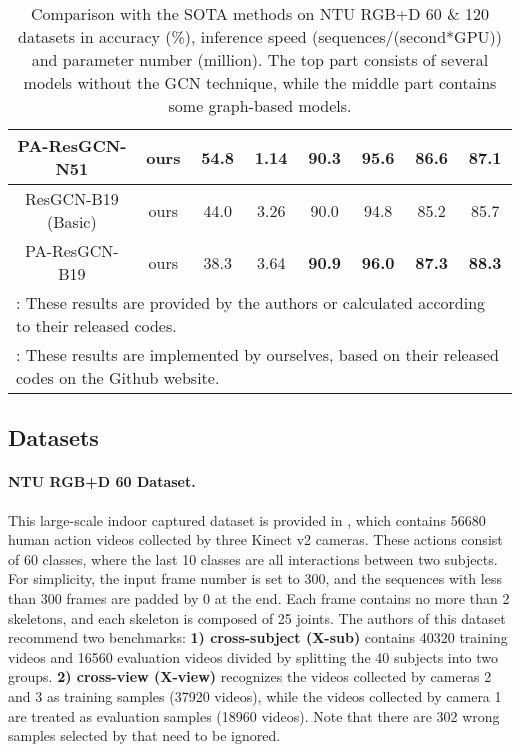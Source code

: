 \documentclass[sigconf]{acmart}
\begin{document}
\begin{table*}
\begin{center}
\begin{tabular}{cc|cc|cc|cc}
  PA-ResGCN-N51 & ours & 54.8 & 1.14 & 90.3 & 95.6 & 86.6 & 87.1 \\
  \hline
  ResGCN-B19 (Basic) & ours & 44.0 & 3.26 & 90.0 & 94.8 & 85.2 & 85.7 \\
  PA-ResGCN-B19 & ours & 38.3 & 3.64 & {\bf 90.9} & {\bf 96.0} & {\bf 87.3} & {\bf 88.3} \\
  \hline
  \multicolumn{8}{l}{: These results are provided by the authors or calculated according to their released codes.}\\
  \multicolumn{8}{l}{: These results are implemented by ourselves, based on their released codes on the Github website.}\\
  \end{tabular}
  \end{center}
  \caption{Comparison with the SOTA methods on NTU RGB+D 60 \& 120 datasets in accuracy (\%), inference speed (sequences/(second*GPU)) and parameter number (million). The top part consists of several models without the GCN technique, while the middle part contains some graph-based models.}\label{tab:ntu}
  \vspace{-0.6cm}
\end{table*}

\subsection{Datasets}
\label{ssec:datasets}

\paragraph{NTU RGB+D 60 Dataset.} This large-scale indoor captured dataset is provided in \cite{shahroudy2016ntu}, which contains 56680 human action videos collected by three Kinect v2 cameras. These actions consist of 60 classes, where the last 10 classes are all interactions between two subjects. For simplicity, the input frame number is set to 300, and the sequences with less than 300 frames are padded by 0 at the end. Each frame contains no more than 2 skeletons, and each skeleton is composed of 25 joints. The authors of this dataset recommend two benchmarks: {\bf 1) cross-subject (X-sub)} contains 40320 training videos and 16560 evaluation videos divided by splitting the 40 subjects into two groups. {\bf 2) cross-view (X-view)} recognizes the videos collected by cameras 2 and 3 as training samples (37920 videos), while the videos collected by camera 1 are treated as evaluation samples (18960 videos). Note that there are 302 wrong samples selected by \cite{liu2019ntu} that need to be ignored.
\end{document}
